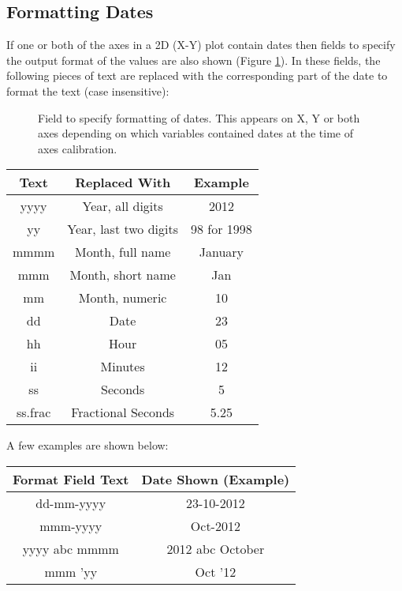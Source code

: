 \documentclass[letterpaper, 11pt]{article}
\begin{document}
\subsection{Formatting Dates}
\label{sec:formattingDatesCSV}
If one or both of the axes in a 2D (X-Y) plot contain dates then fields to specify the output format of the values are also shown (Figure \ref{fig:dateFormat}). In these fields, the following pieces of text are replaced with the corresponding part of the date to format the text (case insensitive):
\begin{figure}
\begin{center}
\caption{Field to specify formatting of dates. This appears on X, Y or both axes depending on which variables contained dates at the time of axes calibration.}
\label{fig:dateFormat}
\end{center}
\end{figure}


\begin{center}
\begin{tabular}{|c|c|c|}
\hline
Text & Replaced With & Example\\
\hline
yyyy & Year, all digits & 2012\\
yy & Year, last two digits & 98 for 1998\\
mmmm & Month, full name & January\\
mmm & Month, short name & Jan\\
mm & Month, numeric & 10\\
dd & Date & 23\\
hh & Hour & 05\\
ii & Minutes & 12\\
ss & Seconds & 5\\
ss.frac & Fractional Seconds & 5.25\\
\hline
\end{tabular}
\end{center}

A few examples are shown below:

\begin{center}
\begin{tabular}{|c|c|}
\hline
Format Field Text & Date Shown (Example)\\
\hline
dd-mm-yyyy & 23-10-2012\\
mmm-yyyy & Oct-2012\\
yyyy abc mmmm & 2012 abc October\\
mmm 'yy & Oct '12\\
\hline
\end{tabular}
\end{center}
\end{document}
